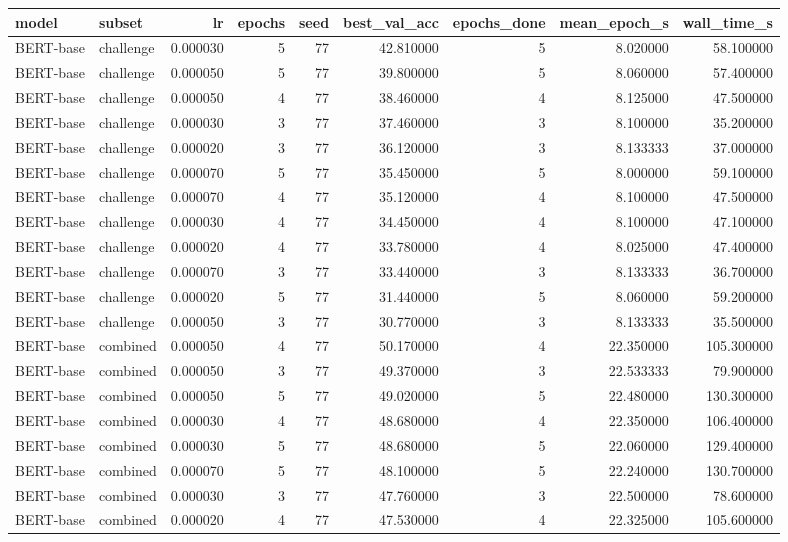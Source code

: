 \begin{tabular}{llrrrrrrr}
\toprule
model & subset & lr & epochs & seed & best_val_acc & epochs_done & mean_epoch_s & wall_time_s \\
\midrule
BERT-base & challenge & 0.000030 & 5 & 77 & 42.810000 & 5 & 8.020000 & 58.100000 \\
BERT-base & challenge & 0.000050 & 5 & 77 & 39.800000 & 5 & 8.060000 & 57.400000 \\
BERT-base & challenge & 0.000050 & 4 & 77 & 38.460000 & 4 & 8.125000 & 47.500000 \\
BERT-base & challenge & 0.000030 & 3 & 77 & 37.460000 & 3 & 8.100000 & 35.200000 \\
BERT-base & challenge & 0.000020 & 3 & 77 & 36.120000 & 3 & 8.133333 & 37.000000 \\
BERT-base & challenge & 0.000070 & 5 & 77 & 35.450000 & 5 & 8.000000 & 59.100000 \\
BERT-base & challenge & 0.000070 & 4 & 77 & 35.120000 & 4 & 8.100000 & 47.500000 \\
BERT-base & challenge & 0.000030 & 4 & 77 & 34.450000 & 4 & 8.100000 & 47.100000 \\
BERT-base & challenge & 0.000020 & 4 & 77 & 33.780000 & 4 & 8.025000 & 47.400000 \\
BERT-base & challenge & 0.000070 & 3 & 77 & 33.440000 & 3 & 8.133333 & 36.700000 \\
BERT-base & challenge & 0.000020 & 5 & 77 & 31.440000 & 5 & 8.060000 & 59.200000 \\
BERT-base & challenge & 0.000050 & 3 & 77 & 30.770000 & 3 & 8.133333 & 35.500000 \\
BERT-base & combined & 0.000050 & 4 & 77 & 50.170000 & 4 & 22.350000 & 105.300000 \\
BERT-base & combined & 0.000050 & 3 & 77 & 49.370000 & 3 & 22.533333 & 79.900000 \\
BERT-base & combined & 0.000050 & 5 & 77 & 49.020000 & 5 & 22.480000 & 130.300000 \\
BERT-base & combined & 0.000030 & 4 & 77 & 48.680000 & 4 & 22.350000 & 106.400000 \\
BERT-base & combined & 0.000030 & 5 & 77 & 48.680000 & 5 & 22.060000 & 129.400000 \\
BERT-base & combined & 0.000070 & 5 & 77 & 48.100000 & 5 & 22.240000 & 130.700000 \\
BERT-base & combined & 0.000030 & 3 & 77 & 47.760000 & 3 & 22.500000 & 78.600000 \\
BERT-base & combined & 0.000020 & 4 & 77 & 47.530000 & 4 & 22.325000 & 105.600000 \\

\end{tabular}
